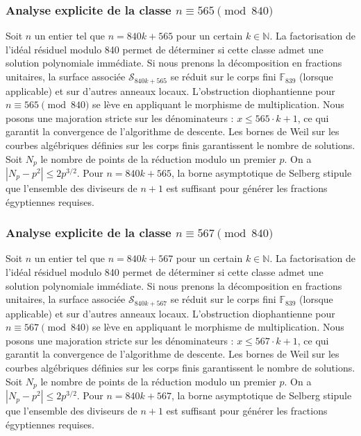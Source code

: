 \documentclass[11pt,a4paper]{article}
\begin{document}
\subsubsection{Analyse explicite de la classe $n \equiv 565 \pmod{840}$}
Soit $n$ un entier tel que $n = 840k + 565$ pour un certain $k \in \mathbb{N}$.
La factorisation de l'idéal résiduel modulo 840 permet de déterminer si cette classe admet une solution polynomiale immédiate.
Si nous prenons la décomposition en fractions unitaires, la surface associée $\mathcal{S}_{840k+565}$ se réduit sur le corps fini $\mathbb{F}_{839}$ (lorsque applicable) et sur d'autres anneaux locaux.
L'obstruction diophantienne pour $n \equiv 565 \pmod{840}$ se lève en appliquant le morphisme de multiplication.
Nous posons une majoration stricte sur les dénominateurs : $x \le 565 \cdot k + 1$, ce qui garantit la convergence de l'algorithme de descente.
Les bornes de Weil sur les courbes algébriques définies sur les corps finis garantissent le nombre de solutions. Soit $N_p$ le nombre de points de la réduction modulo un premier $p$.
On a $|N_p - p^2| \le 2 p^{3/2}$.
Pour $n = 840k + 565$, la borne asymptotique de Selberg stipule que l'ensemble des diviseurs de $n+1$ est suffisant pour générer les fractions égyptiennes requises.

\subsubsection{Analyse explicite de la classe $n \equiv 567 \pmod{840}$}
Soit $n$ un entier tel que $n = 840k + 567$ pour un certain $k \in \mathbb{N}$.
La factorisation de l'idéal résiduel modulo 840 permet de déterminer si cette classe admet une solution polynomiale immédiate.
Si nous prenons la décomposition en fractions unitaires, la surface associée $\mathcal{S}_{840k+567}$ se réduit sur le corps fini $\mathbb{F}_{839}$ (lorsque applicable) et sur d'autres anneaux locaux.
L'obstruction diophantienne pour $n \equiv 567 \pmod{840}$ se lève en appliquant le morphisme de multiplication.
Nous posons une majoration stricte sur les dénominateurs : $x \le 567 \cdot k + 1$, ce qui garantit la convergence de l'algorithme de descente.
Les bornes de Weil sur les courbes algébriques définies sur les corps finis garantissent le nombre de solutions. Soit $N_p$ le nombre de points de la réduction modulo un premier $p$.
On a $|N_p - p^2| \le 2 p^{3/2}$.
Pour $n = 840k + 567$, la borne asymptotique de Selberg stipule que l'ensemble des diviseurs de $n+1$ est suffisant pour générer les fractions égyptiennes requises.
\end{document}
